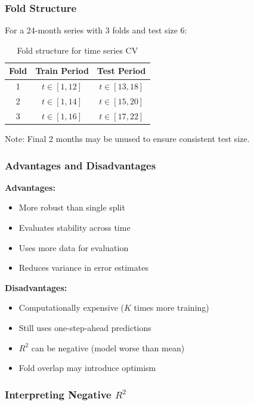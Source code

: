 \documentclass[12pt,a4paper]{article}
\begin{document}
\subsubsection{Fold Structure}

For a 24-month series with 3 folds and test size 6:

\begin{table}[H]
\centering
\begin{tabular}{ccc}
\toprule
\textbf{Fold} & \textbf{Train Period} & \textbf{Test Period} \\
\midrule
1 & $t \in [1, 12]$ & $t \in [13, 18]$ \\
2 & $t \in [1, 14]$ & $t \in [15, 20]$ \\
3 & $t \in [1, 16]$ & $t \in [17, 22]$ \\
\bottomrule
\end{tabular}
\caption{Fold structure for time series CV}
\end{table}

Note: Final 2 months may be unused to ensure consistent test size.

\subsubsection{Advantages and Disadvantages}

\textbf{Advantages:}
\begin{itemize}
    \item More robust than single split
    \item Evaluates stability across time
    \item Uses more data for evaluation
    \item Reduces variance in error estimates
\end{itemize}

\textbf{Disadvantages:}
\begin{itemize}
    \item Computationally expensive ($K$ times more training)
    \item Still uses one-step-ahead predictions
    \item $R^2$ can be negative (model worse than mean)
    \item Fold overlap may introduce optimism
\end{itemize}

\subsubsection{Interpreting Negative $R^2$}
\end{document}
